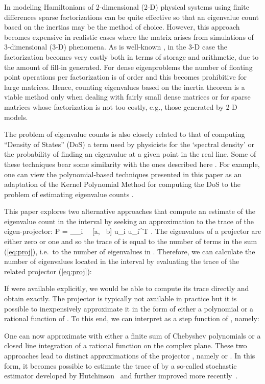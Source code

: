 \documentclass[12pt]{article}		\usepackage{tabls,multirow}
\newcommand{\ab}{[a, \ b]}
\def\nref#1{(\ref{#1})}
\newcommand{\eq}[1]{}
\begin{document}
In modeling Hamiltonians of 2-dimensional (2-D) physical systems using
finite differences sparse factorizations can be quite effective so
that an eigenvalue count based on the inertias may be the method of
choice. However, this approach becomes expensive in realistic cases
where the matrix arises from simulations of 3-dimensional (3-D)
phenomena. As is well-known \cite{George-Liu-book,TDavis-book}, in the
3-D case the factorization becomes very costly both in terms of
storage and arithmetic, due to the amount of fill-in generated.  For
dense eigenproblems the number of floating point operations per
factorization is of order  and this becomes prohibitive for
large matrices. Hence, counting eigenvalues based on the inertia
theorem is a viable method only when dealing with fairly small dense
matrices or for sparse matrices whose factorization is not too costly,
e.g., those generated by 2-D models.

The problem of eigenvalue counts is also closely related to that of
computing ``Density of States'' (DoS) a term used by physicists for
the `spectral density' or the probability of finding an eigenvalue at
a given point in the real line.  Some of these techniques bear some
similarity with the ones described here \cite{LinYangSaad13-TR}. For
example, one can view the polynomial-based techniques presented in
this paper as an adaptation of the Kernel Polynomial Method for
computing the DoS to the problem of estimating eigenvalue counts
\cite{SilverRoederAl,Wang-DOS,Roder-al-96,SilverRoder1994}.

This paper explores two alternative approaches that compute an
estimate of the eigenvalue count in the interval  by seeking an
approximation to the trace of the eigen-projector: \eq{eq:proj} P =
\sum_{\lambda_i \ \in \ \ab} u_i u_i^T .  \en The eigenvalues of a
projector are either zero or one and so the trace of  is equal to
the number of terms in the sum \nref{eq:proj}, i.e.~to the number of
eigenvalues in .  Therefore, we can calculate the number of
eigenvalues  located in the interval  by evaluating
the trace of the related projector \nref{eq:proj}:

If  were available explicitly, we would be able to compute its
trace directly and obtain  exactly.  The projector  is
typically not available in practice but it is possible to
inexpensively approximate it in the form of either a polynomial or a
rational function of . To this end, we can interpret  as a step
function of , namely:

One can now approximate  with either a finite sum  of
Chebyshev polynomials or a closed line integration of a rational
function  on the complex plane. These two approaches lead to
distinct approximations of the projector , namely  or .  In this form, it becomes possible to
estimate the trace of  by a so-called stochastic estimator 
developed by Hutchinson~\cite{Hutchinson-est} and further improved
more recently~\cite{JTangYS, Iitaka:705693, Wong:2004tm}.
\end{document}
